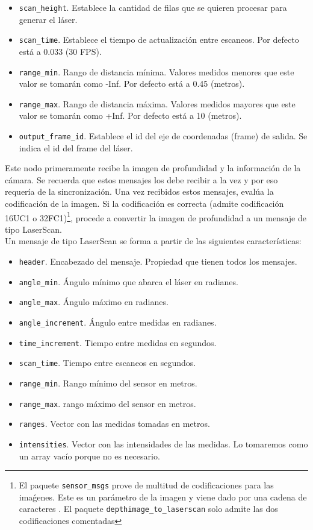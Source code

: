 \begin{itemize}

	\item \texttt{scan\_height}. Establece la cantidad de filas que se quieren procesar para generar el láser. 
	\item \texttt{scan\_time}. Establece el tiempo de actualización entre escaneos. Por defecto está a 0.033 (30 FPS).
	\item \texttt{range\_min}. Rango de distancia mínima. Valores medidos menores que este valor se tomarán como -Inf. Por defecto está a 0.45 (metros).
	\item \texttt{range\_max}. Rango de distancia máxima. Valores medidos mayores que este valor se tomarán como +Inf. Por defecto está a 10 (metros).
	\item \texttt{output\_frame\_id}. Establece el id del eje de coordenadas (frame) de salida. Se indica el id del frame del láser.

\end{itemize}

Este nodo primeramente recibe la imagen de profundidad y la información de la cámara. Se recuerda que estos mensajes los debe recibir a la vez y por eso requería de la sincronización. Una vez recibidos estos mensajes, evalúa la codificación de la imagen. Si la codificación es correcta (admite codificación 16UC1 o 32FC1)\footnote{El paquete \texttt{sensor\_msgs} prove de multitud de codificaciones para las imaǵenes. Este es un parámetro de la imagen y viene dado por una cadena de caracteres \cite{enc}. El paquete \texttt{depthimage\_to\_laserscan} solo admite las dos codificaciones comentadas}, procede a convertir la imagen de profundidad a un mensaje de tipo LaserScan.\\

Un mensaje de tipo LaserScan se forma a partir de las siguientes características:

\begin{itemize}

	\item \texttt{header}. Encabezado del mensaje. Propiedad que tienen todos los mensajes.
	\item \texttt{angle\_min}. Ángulo mínimo que abarca el láser en radianes.
	\item \texttt{angle\_max}. Ángulo máximo en radianes.
	\item \texttt{angle\_increment}. Ángulo entre medidas en radianes.
	\item \texttt{time\_increment}. Tiempo entre medidas en segundos.
	\item \texttt{scan\_time}. Tiempo entre escaneos en segundos.
	\item \texttt{range\_min}. Rango mínimo del sensor en metros.
	\item \texttt{range\_max}. rango máximo del sensor en metros.
	\item \texttt{ranges}. Vector con las medidas tomadas en metros.
	\item \texttt{intensities}. Vector con las intensidades de las medidas. Lo tomaremos como un array vacío porque no es necesario.

\end{itemize}


